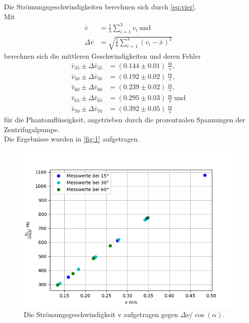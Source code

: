 Die Strömungsgeschwindigkeiten berechnen sich durch \autoref{eq:vier}. \\
Mit 
\begin{align*}
  \bar v&=\frac{1}{3}\sum\limits_{i=1}^{3} v_i\ \textrm{und}\\
  \Delta\bar v&=\sqrt{\frac{1}{6}\sum\limits_{i=1}^{3} (v_i - \bar x)^2}
\end{align*}
berechnen sich die mittleren Geschwindigkeiten und deren Fehler 
\begin{align*}
  \bar v_{45} \pm \Delta \bar v_{45}&=(0.144 \pm 0.01)\ \frac{\textrm{m}}{s},\\
  \bar v_{50} \pm \Delta \bar v_{50}&=(0.192 \pm 0.02)\ \frac{\textrm{m}}{s},\\
  \bar v_{60} \pm \Delta \bar v_{60}&=(0.239 \pm 0.02)\ \frac{\textrm{m}}{s},\\
  \bar v_{65} \pm \Delta \bar v_{65}&=(0.295 \pm 0.03)\ \frac{\textrm{m}}{s}\ \textrm{und}\\
  \bar v_{70} \pm \Delta \bar v_{70}&=(0.392 \pm 0.05)\ \frac{\textrm{m}}{s}
\end{align*}
für die Phantomflüssigkeit, angetrieben durch die prozentualen Spannungen der Zentrifugalpumpe.\\
Die Ergebnisse wurden in \autoref{fig:1} aufgetragen.
\begin{figure}[H]
  \centering
  \includegraphics[width=12cm]{content/1}
  \caption{Die Strömungsgeschwindigkeit v aufgetragen gegen $\Delta\nu$/$\cos(\alpha)$.}
  \label{fig:1}
\end{figure}

